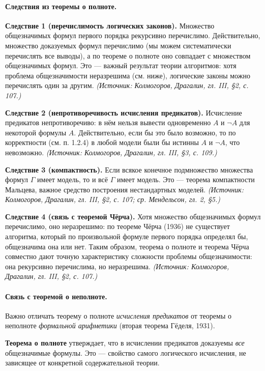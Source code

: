 \documentclass[a4paper,12pt]{article}
\begin{document}
\paragraph{Следствия из теоремы о полноте.}

\textbf{Следствие 1 (перечислимость логических законов).} Множество общезначимых формул первого порядка рекурсивно перечислимо. Действительно, множество доказуемых формул перечислимо (мы можем систематически перечислять все выводы), а по теореме о полноте оно совпадает с множеством общезначимых формул. Это --- важный результат теории алгоритмов: хотя проблема общезначимости неразрешима (см. ниже), логические законы можно перечислять один за другим.
\textit{(Источник: Колмогоров, Драгалин, гл. III, §2, с. 107.)}

\textbf{Следствие 2 (непротиворечивость исчисления предикатов).} Исчисление предикатов непротиворечиво: в нём нельзя вывести одновременно \(A\) и \(\neg A\) для некоторой формулы \(A\). Действительно, если бы это было возможно, то по корректности (см. п. 1.2.4) в любой модели были бы истинны \(A\) и \(\neg A\), что невозможно.
\textit{(Источник: Колмогоров, Драгалин, гл. III, §3, с. 109.)}

\textbf{Следствие 3 (компактность).} Если всякое конечное подмножество множества формул \(\Gamma\) имеет модель, то и всё \(\Gamma\) имеет модель. Это --- теорема компактности Мальцева, важное средство построения нестандартных моделей.
\textit{(Источник: Колмогоров, Драгалин, гл. III, §2, с. 107; ср. Мендельсон, гл. 2, §5.)}

\textbf{Следствие 4 (связь с теоремой Чёрча).} Хотя множество общезначимых формул перечислимо, оно неразрешимо: по теореме Чёрча (1936) не существует алгоритма, который по произвольной формуле первого порядка определял бы, общезначима она или нет. Таким образом, теорема о полноте и теорема Чёрча совместно дают точную характеристику сложности проблемы общезначимости: она рекурсивно перечислима, но неразрешима.
\textit{(Источник: Колмогоров, Драгалин, гл. III, §2, с. 107.)}

\paragraph{Связь с теоремой о неполноте.} Важно отличать теорему о полноте \emph{исчисления предикатов} от теоремы о неполноте \emph{формальной арифметики} (вторая теорема Гёделя, 1931).

\textbf{Теорема о полноте} утверждает, что в исчислении предикатов доказуемы \emph{все} общезначимые формулы. Это --- свойство самого логического исчисления, не зависящее от конкретной содержательной теории.
\end{document}
